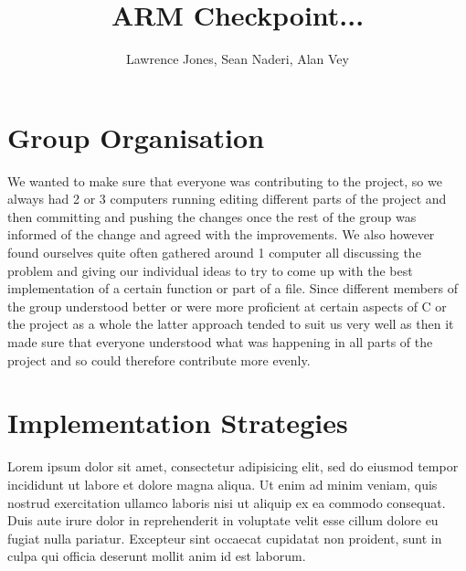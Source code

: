 \documentclass[11pt]{article}
\begin{document}
\title{ARM Checkpoint... }
\author{Lawrence Jones, Sean Naderi, Alan Vey}

\maketitle

\section{Group Organisation}

We wanted to make sure that everyone was contributing to the project, so we always had 2 or 3 computers running editing different parts of the project and then committing and pushing the changes once the rest of the group was informed of the change and agreed with the improvements. We also however found ourselves quite often gathered around 1 computer all discussing the problem and giving our individual ideas to try to come up with the best implementation of a certain function or part of a file. Since different members of the group understood better or were more proficient at certain aspects of C or the project as a whole the latter approach tended to suit us very well as then it made sure that everyone understood what was happening in all parts of the project and so could therefore contribute more evenly.  


\section{Implementation Strategies}

Lorem ipsum dolor sit amet, consectetur adipisicing elit, sed do eiusmod tempor
incididunt ut labore et dolore magna aliqua. Ut enim ad minim veniam, quis
nostrud exercitation ullamco laboris nisi ut aliquip ex ea commodo consequat.
Duis aute irure dolor in reprehenderit in voluptate velit esse cillum dolore eu
fugiat nulla pariatur. Excepteur sint occaecat cupidatat non proident, sunt in
culpa qui officia deserunt mollit anim id est laborum.
\end{document}
